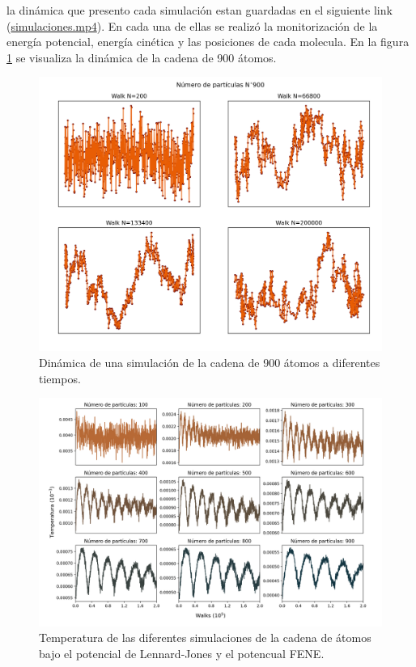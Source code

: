 la dinámica que presento cada simulación estan guardadas en el siguiente link (\href{https://github.com/giovannilopez9808/Notas_Agosto_2020/tree/master/Simulaciones/Proyecto_4_2/Graphics/simulaciones}{simulaciones.mp4}).
En cada una de ellas se realizó la monitorización de la energía potencial, energía cinética y las posiciones de cada molecula. En la figura \ref{fig:dim}
se visualiza la dinámica de la cadena de 900 átomos.
\begin{figure}[H]
    \centering
    \hspace{-0.5cm}
    \includegraphics[scale=0.3]{../Graphics/dim_8.png}
    \caption{Dinámica de una simulación de la cadena de 900 átomos a diferentes tiempos.}
    \label{fig:dim}
\end{figure}
\begin{figure}[H]
    \centering
    \hspace{-0.2cm}
    \includegraphics[scale=0.25]{../Graphics/temp.png}
    \caption{Temperatura de las diferentes simulaciones de la cadena de átomos bajo el potencial de Lennard-Jones y el potencual FENE.}
    \label{fig:temp}
\end{figure}
